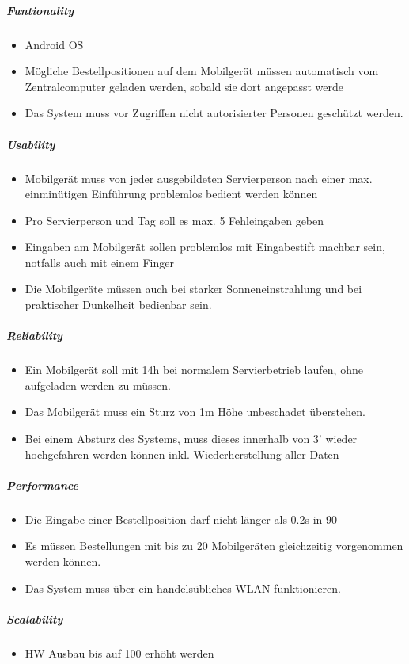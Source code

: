 \documentclass{article}
\begin{document}
\subparagraph{Funtionality\\}
\begin{itemize}
	\item Android OS
	\item Mögliche Bestellpositionen auf dem Mobilgerät müssen automatisch vom Zentralcomputer geladen werden, sobald sie dort angepasst werde
	\item  Das System muss vor Zugriffen nicht autorisierter Personen geschützt werden.
\end{itemize}
\subparagraph{Usability\\}
\begin{itemize}
	\item Mobilgerät muss von jeder ausgebildeten Servierperson nach einer max. einminütigen 
Einführung problemlos bedient werden können
	\item Pro Servierperson und Tag soll es max. 5 Fehleingaben geben
	\item Eingaben am Mobilgerät sollen problemlos mit Eingabestift machbar sein, notfalls auch 
mit einem Finger
	\item Die Mobilgeräte müssen auch bei starker Sonneneinstrahlung und bei praktischer Dunkelheit bedienbar sein.
\end{itemize}
\subparagraph{Reliability\\}
\begin{itemize}
	\item Ein Mobilgerät soll mit 14h bei normalem Servierbetrieb laufen, ohne aufgeladen werden 
zu müssen.
	\item Das Mobilgerät muss ein Sturz von 1m Höhe unbeschadet überstehen.
	\item Bei einem Absturz des Systems, muss dieses innerhalb von 3’ wieder hochgefahren 
werden können inkl. Wiederherstellung aller Daten
\end{itemize}
\subparagraph{Performance\\}
\begin{itemize}
	\item Die Eingabe einer Bestellposition darf nicht länger als 0.2s in 90%
	\item Es müssen Bestellungen mit bis zu 20 Mobilgeräten gleichzeitig vorgenommen werden 
können.
	\item  Das System muss über ein handelsübliches WLAN funktionieren.
\end{itemize}
\subparagraph{Scalability\\}
\begin{itemize}
	\item  HW Ausbau bis auf 100 erhöht werden
\end{itemize}
\end{document}
